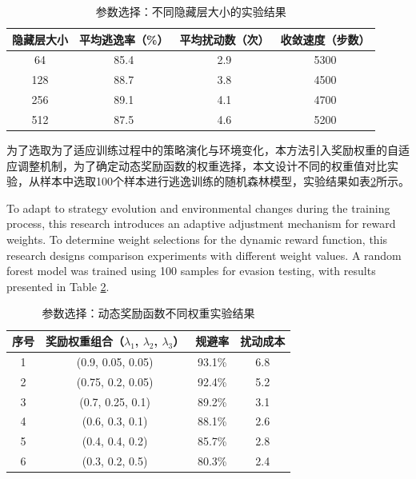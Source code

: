 \begin{table}[htbp]
	\centering
	\caption{参数选择：不同隐藏层大小的实验结果}
	\label{tab:5.7}
	\begin{tabular*}{0.9\textwidth}{@{\extracolsep{\fill}}cccc}
		\toprule
		隐藏层大小 & 平均逃逸率（\%） & 平均扰动数（次） & 收敛速度（步数） \\
		\midrule
		64  & 85.4 & 2.9 & 5300 \\
		128 & 88.7 & 3.8 & 4500 \\
		256 & 89.1 & 4.1 & 4700 \\
		512 & 87.5 & 4.6 & 5200 \\
		\bottomrule
	\end{tabular*}
\end{table}

为了选取为了适应训练过程中的策略演化与环境变化，本方法引入奖励权重的自适应调整机制，为了确定动态奖励函数的权重选择，本文设计不同的权重值对比实验，从样本中选取100个样本进行逃逸训练的随机森林模型，实验结果如表\ref{tab:5.8}所示。

To adapt to strategy evolution and environmental changes during the training process, this research introduces an adaptive adjustment mechanism for reward weights. To determine weight selections for the dynamic reward function, this research designs comparison experiments with different weight values. A random forest model was trained using 100 samples for evasion testing, with results presented in Table \ref{tab:5.8}.

\renewcommand{\arraystretch}{1.3}
\begin{table}[htbp]
	\centering
	\caption{参数选择：动态奖励函数不同权重实验结果}
	\label{tab:5.8}
	\begin{tabular*}{0.9\textwidth}{@{\extracolsep{\fill}}cccc}
		\toprule
		序号 & 奖励权重组合（$\lambda_1$, $\lambda_2$, $\lambda_3$） & 规避率 & 扰动成本 \\
		\midrule
		1 & (0.9, 0.05, 0.05) & 93.1\% & 6.8 \\
		2 & (0.75, 0.2, 0.05) & 92.4\% & 5.2 \\
		3 & (0.7, 0.25, 0.1) & 89.2\% & 3.1 \\
		4 & (0.6, 0.3, 0.1) & 88.1\% & 2.6 \\
		5 & (0.4, 0.4, 0.2) & 85.7\% & 2.8 \\
		6 & (0.3, 0.2, 0.5) & 80.3\% & 2.4 \\
		\bottomrule
	\end{tabular*}
\end{table}

